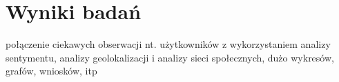 \chapter{Wyniki badań}
połączenie ciekawych obserwacji nt. użytkowników z wykorzystaniem
analizy sentymentu, analizy geolokalizacji i analizy
sieci społecznych, dużo wykresów, grafów, wniosków, itp